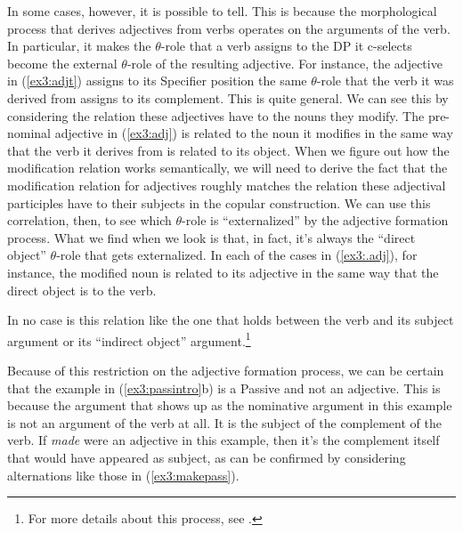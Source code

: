 In some cases, however, it is possible to tell. This is because the morphological process that derives adjectives from verbs operates on the arguments of the verb. In particular, it makes the $\theta$-role that a verb assigns to the DP it c-selects become the external $\theta$-role of the resulting adjective. For instance, the adjective in (\ref{ex3:adjt}) assigns to its Specifier position the same $\theta$-role that the verb it was derived from assigns to its complement. This is quite general. We can see this by considering the relation these adjectives have to the nouns they modify. The pre-nominal adjective in (\ref{ex3:adj}) is related to the noun it modifies in the same way that the verb it derives from is related to its object. When we figure out how the modification relation works semantically, we will need to derive the fact that the modification relation for adjectives roughly matches the relation these adjectival participles have to their subjects in the copular construction. We can use this correlation, then, to see which $\theta$-role is ``externalized'' by the adjective formation process. What we find when we look is that, in fact, it's always the ``direct object'' $\theta$-role that gets externalized. In each of the cases in (\ref{ex3:.adj}), for instance, the modified noun is related to its adjective in the same way that the direct object is to the verb.
\begin{exe}
	\ex \label{ex3:.adj}
	\begin{xlist}
	\end{xlist}  
\end{exe}
In no case is this relation like the one that holds between the verb and its subject argument or its ``indirect object'' argument.\footnote{For more details about this process, see \citet{Levin:1986}.}

Because of this restriction on the adjective formation process, we can be certain that the example in (\ref{ex3:passintro}b) is a Passive and not an adjective. This is because the argument that shows up as the nominative argument in this example is not an argument of the verb at all. It is the subject of the complement of the verb. If \emph{made} were an adjective in this example, then it's the complement itself that would have appeared as subject, as can be confirmed by considering alternations like those in (\ref{ex3:makepass}).
\begin{exe}
\ex \label{ex3:makepass} 
\begin{xlist}
\end{xlist}
\end{exe}

